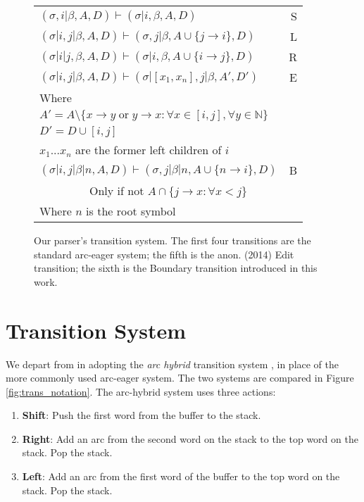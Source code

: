 \documentclass[11pt,letterpaper]{article}
\begin{document}
\begin{figure}
    \centering
    \small
    \begin{tabular}{lr}
        $(\sigma,i | \beta, A, D) \vdash (\sigma | i, \beta, A, D) $ \hfill & \hfill S \\
        $(\sigma | i,j | \beta, A, D) \vdash ( \sigma, j | \beta, A \cup \{ j \rightarrow i \}, D ) $ \hfill & \hfill L \\
        $(\sigma | i | j, \beta, A, D) \vdash ( \sigma | i , \beta, A \cup \{ i \rightarrow j \}, D ) $ \hfill & \hfill R \\
    \hline
    $(\sigma | i, j | \beta, A, D) \vdash (\sigma | [x_1, x_n], j | \beta,A',D')$ & E \\
    Where \\
    $A' = A \setminus \{x \rightarrow y\;\mathrm{or}\; y \rightarrow x : \forall x \in [i, j], \forall y \in \mathbb{N} \}$ \\
        $D' = D \cup [i, j]$ \\
    $x_1...x_n$ are the former left children of $i$ \\
    \hline
    $(\sigma | i, j | \beta | n, A, D) \vdash (\sigma, j | \beta | n, A \cup \{n \rightarrow i\}, D)$ & B \\
    \multicolumn{2}{c}{Only if not $A \cap \{j \rightarrow x : \forall x < j\}$} \\
    Where $n$ is the root symbol \\
    \end{tabular}
    \caption{\small Our parser's transition system.  The first four transitions
        are the standard arc-eager system; the fifth is the anon. (2014) Edit
        transition; the sixth is the Boundary transition introduced
        in this work.\label{fig:ae_notation}}
\end{figure}
%

\section{Transition System}

We depart from \citet{honnibal:14} in adopting the \emph{arc hybrid} transition
system \citep{kuhlman:11}, in place of the more commonly used arc-eager system.
The two systems are
compared in Figure \ref{fig:trans_notation}.  The arc-hybrid system uses three
actions:

\begin{enumerate}
    \item \textbf{Shift}: Push the first word from the buffer to the stack.
    \item \textbf{Right}: Add an arc from the second word on the stack to the top
                          word on the stack. Pop the stack.
    \item \textbf{Left}: Add an arc from the first word of the buffer to the top
                         word on the stack. Pop the stack.
\end{enumerate}
\end{document}
